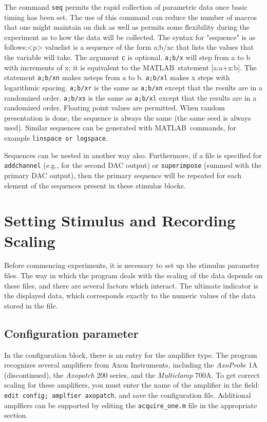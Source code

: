 \documentclass[11pt, letterpaper, titlepage]{paper}
\newcommand{\ml}{\textsf{MATLAB}}
\begin{document}
The command \texttt{seq} permits the rapid collection of 
parametric data once basic timing has been set. The use of this 
command can reduce the number of macros that one might maintain on 
disk as well as permits some flexibility during the experiment as 
to how the data will be collected. The syntax for "sequence" is as 
follows:<p>
          valuelist is a sequence of the form a;b/xc  that lists
the values that the variable will take. The argument \texttt{c} is 
optional. \texttt{a;b/x} will step from a to b with increments of 
x; it is equivalent to the \ml\ statement [a:a+x:b]. The statement 
\texttt{a;b/xn} makes xsteps from a to b. \texttt{a;b/xl} makes x 
steps with logarithmic spacing. \texttt{a;b/xr} is the same as 
\texttt{a;b/xn} except that the results are in a randomized order. 
\texttt{a;b/xs} is the same as \texttt{a;b/xl} except that the 
results are in a randomized order. Floating point values are 
permitted. When random presentation is done, the sequence is 
always the same (the same seed is always used). Similar sequences 
can be generated with \ml\ commands,
for example \texttt{linspace or logspace}.

Sequences can be nested in another way also. Furthermore, if a 
file is specified for \texttt{addchannel} (e.g., for the second 
DAC output) or \texttt{superimpose} (summed with the primary DAC 
output), then the primary sequence will be repeated for each 
element of the sequences present in these stimulus blocks.

\section{Setting Stimulus and Recording Scaling}
\label{scaling}

Before commencing experiments, it is necessary to set up the 
stimulus parameter files. The way in which the program deals with 
the scaling of the data depends on these files, and there are 
several factors which interact. The ultimate indicator is the 
displayed data, which corresponds exactly to the numeric values of 
the data stored in the file.

\subsection{Configuration parameter}
In the configuration block, there is an entry for the amplifier 
type. The program recognizes several amplifiers from Axon 
Instruments, including the \textsl{AxoProbe} 1A (discontinued), 
the \textsl{Axopatch} 200 series, and the \textsl{Multiclamp} 
700A. To get correct scaling for these amplifiers, you must enter 
the name of the amplifier in the field: \texttt{edit config; 
amplfier axopatch}, and save the configuration file. Additional 
amplfiers can be supported by editing the \texttt{acquire\_one.m} 
file in the appropriate section.
\end{document}
